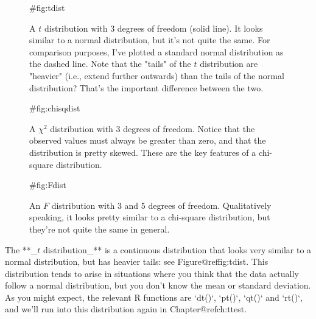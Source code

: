 \begin{figure}
\begin{center}
\caption{A $t$ distribution with 3 degrees of freedom (solid line). It looks similar to a normal distribution, but it's not quite the same. For comparison purposes, I've plotted a standard normal distribution as the dashed line. Note that the "tails" of the $t$ distribution are "heavier" (i.e., extend further outwards) than the tails of the normal distribution? That's the important difference between the two. }
{#fig:tdist}
\HR
\end{center}
\end{figure}

\begin{figure}
\begin{center}
\caption{A $\chi^2$ distribution with 3 degrees of freedom. Notice that the observed values must always be greater than zero, and that the distribution is pretty skewed. These are the key features of a chi-square distribution.}
{#fig:chisqdist}
\HR
\end{center}
\end{figure}

\begin{figure}
\begin{center}
\caption{An $F$ distribution with 3 and 5 degrees of freedom. Qualitatively speaking, it looks pretty similar to a chi-square distribution, but they're not quite the same in general.}
{#fig:Fdist}
\HR
\end{center}
\end{figure}



\item  The **_$t$ distribution_** is a continuous distribution that looks very similar to a normal distribution, but has heavier tails: see Figure@reffig:tdist. This distribution tends to arise in situations where you think that the data actually follow a normal distribution, but you don't know the mean or standard deviation. As you might expect, the relevant R functions are `dt()`, `pt()`, `qt()` and `rt()`, and we'll run into this distribution again in Chapter@refch:ttest. 

